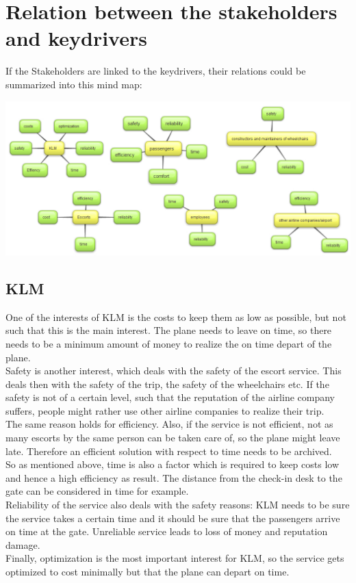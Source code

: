\documentclass[a4paper, 11pt, notitlepage]{report}
\begin{document}
\section{Relation between the stakeholders and keydrivers}
If the Stakeholders are linked to the keydrivers, their relations could be summarized into this mind map:
\begin{center}
\includegraphics[scale=0.4]{figures/relationstakeholders.jpg}
\end{center}
\subsection{KLM}
One of the interests of KLM is the costs to keep them as low as possible, but not such that this is the main interest. The plane needs to leave on time, so there needs to be a minimum amount of money to realize the on time depart of the plane.\\
Safety is another interest, which deals with the safety of the escort service. This deals then with the safety of the trip, the safety of the wheelchairs etc. If the safety is not of a certain level, such that the reputation of the airline company suffers, people might rather use other airline companies to realize their trip.\\
The same reason holds for efficiency. Also, if the service is not efficient, not as many escorts by the same person can be taken care of, so the plane might leave late. Therefore an efficient solution with respect to time needs to be archived.\\
So as mentioned above, time is also a factor which is required to keep costs low and hence a high efficiency as result. The distance from the check-in desk to the gate can be considered in time for example.\\
Reliability of the service also deals with the safety reasons: KLM needs to be sure the service takes a certain time and it should be sure that the passengers arrive on time at the gate. Unreliable service leads to loss of money and reputation damage.\\
Finally, optimization is the most important interest for KLM, so the service gets optimized to cost minimally but that the plane can depart on time.
\end{document}
